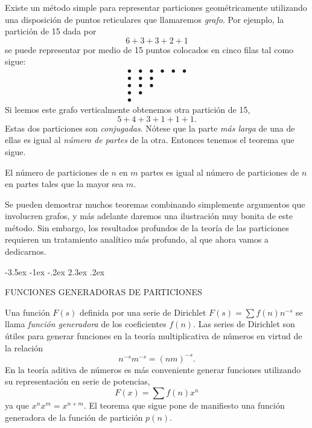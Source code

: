 \documentclass[12pt,a4paper]{book}
\makeatletter
\renewcommand\section{\@startsection{section}{1}{\z@}%
  {-3.5ex \@plus -1ex \@minus -.2ex}%
  {2.3ex \@plus .2ex}%
  {\normalfont\Large\bfseries\raggedright}}
\makeatother
\begin{document}
    Existe un método simple para representar particiones geométricamente utilizando una
    disposición de puntos reticulares que llamaremos \textit{grafo}. Por ejemplo, la partición
    de 15 dada por
    \begin{equation*}
        6+3+3+2+1
    \end{equation*}
    se puede representar por medio de 15 puntos colocados en cinco filas tal como sigue:
    \begin{equation*}
        \begin{array}{cccccc}
            \bullet&\bullet&\bullet&\bullet&\bullet&\bullet\\
            \bullet&\bullet&\bullet&&&\\
            \bullet&\bullet&\bullet&&&\\
            \bullet&\bullet&&&&\\
            \bullet&&&&&
        \end{array}
    \end{equation*}
    Si leemos este grafo verticalmente obtenemos otra partición de 15,
    \begin{equation*}
        5+4+3+1+1+1.
    \end{equation*}
    Estas dos particiones son \textit{conjugadas}. Nótese que la parte \textit{más larga} de una
    de ellas es igual al \textit{número de partes} de la otra. Entonces tenemos el teorema que
    sigue.

    \begin{teorema}\label{teo:14-1}
        El número de particiones de $n$ en $m$ partes es igual al número de particiones de $n$
        en partes tales que la mayor sea $m$.
    \end{teorema}

    Se pueden demostrar muchos teoremas combinando simplemente argumentos que involucren
    grafos, y más adelante daremos una ilustración muy bonita de este método. Sin embargo, los
    resultados profundos de la teoría de las particiones requieren un tratamiento analítico más
    profundo, al que ahora vamos a dedicarnos.

    \section{FUNCIONES GENERADORAS DE PARTICIONES}

    Una función $F(s)$ definida por una serie de Dirichlet $F(s)=\sum f(n)n^{-s}$ se llama
    \textit{función generadora} de los coeficientes $f(n)$. Las series de Dirichlet son útiles
    para generar funciones en la teoría multiplicativa de números en virtud de la relación
    \begin{equation*}
        n^{-s}m^{-s}=(nm)^{-s}.
    \end{equation*}
    En la teoría aditiva de números es más conveniente generar funciones utilizando su
    representación en serie de potencias,
    \begin{equation*}
        F(x)=\sum f(n)x^{n}
    \end{equation*}
    ya que $x^{n}x^{m}=x^{n+m}$. El teorema que sigue pone de manifiesto una función generadora de
    la función de partición $p(n)$.
\end{document}
